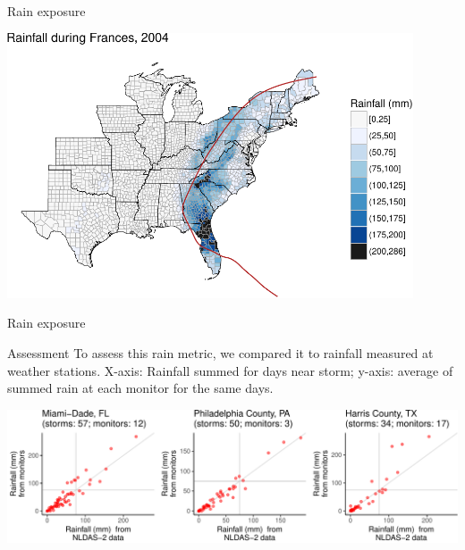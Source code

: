 \documentclass[ignorenonframetext,]{beamer}
\begin{document}
\begin{frame}{Rain exposure}

\begin{center}\includegraphics[width=0.9\textwidth]{anderson_jan18_files/figure-beamer/frances_rain_example-1} \end{center}

\end{frame}

\begin{frame}{Rain exposure}

\small

\begin{block}{Assessment}
To assess this rain metric, we compared it to rainfall measured at weather stations. X-axis: Rainfall summed for days near storm; y-axis: average of summed rain at each monitor for the same days.
\end{block}

\begin{flushleft}\includegraphics[width=1.05\textwidth]{anderson_jan18_files/figure-beamer/compare_rain_ex_counties-1} \end{flushleft}

\end{frame}
\end{document}
